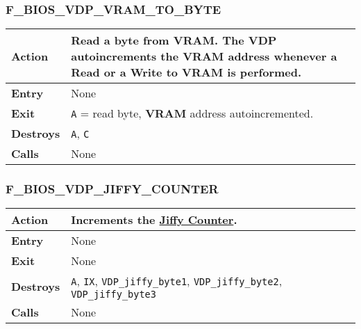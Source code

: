         \subsubsection{F\_BIOS\_VDP\_VRAM\_TO\_BYTE}
        \label{func:fbiosvdpvramtobyte}
        \begin{tabular}{l p{9cm}}
            \hline\textbf{Action}
            & Read a byte from \textbf{VRAM}. The \textbf{VDP} autoincrements
            the \textbf{VRAM} address whenever a Read or a Write to
            \textbf{VRAM} is performed.\\
            \hline\textbf{Entry} & None\\
            \hline\textbf{Exit} & \texttt{A} = read byte, \textbf{VRAM} address
            autoincremented.\\
            \hline\textbf{Destroys} & \texttt{A}, \texttt{C} \\
            \hline\textbf{Calls} & None\\
            \hline
        \end{tabular}

        \subsubsection{F\_BIOS\_VDP\_JIFFY\_COUNTER}
        \label{func:fbiosvdpjiffycounter}
        \begin{tabular}{l p{9cm}}
            \hline\textbf{Action}
            & Increments the \hyperref[subsec:jiffy_counter]{Jiffy Counter}.\\
            \hline\textbf{Entry} & None\\
            \hline\textbf{Exit} & None\\
            \hline\textbf{Destroys} & \texttt{A}, \texttt{IX},
            \texttt{VDP\_jiffy\_byte1}, \texttt{VDP\_jiffy\_byte2},
            \texttt{VDP\_jiffy\_byte3}\\
            \hline\textbf{Calls} & None\\
            \hline
        \end{tabular}

